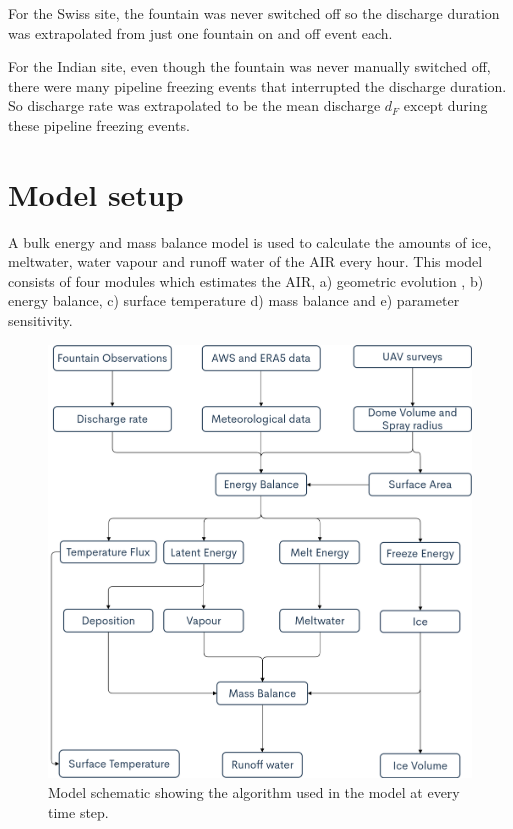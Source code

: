 \documentclass[utf8]{frontiersSCNS} %
\begin{document}
For the Swiss site, the fountain was never switched off so the discharge duration was extrapolated from just one fountain
on and off event each.

For the Indian site, even though the fountain was never manually switched off, there were many pipeline freezing events that
interrupted the discharge duration. So discharge rate was extrapolated to be the mean discharge $d_F$ except during
these pipeline freezing events.

\section{Model setup}

A bulk energy and mass balance model is used to calculate the amounts of ice, meltwater, water vapour and runoff water
of the AIR every hour. This model consists of four modules which estimates the AIR, a) geometric evolution , b) energy
balance, c) surface temperature d) mass balance and e) parameter sensitivity.

\begin{figure} \begin{center} \includegraphics[width=12 cm]{Figures/model_schematic.png} \end{center} \caption{Model
		schematic showing the algorithm used in the model at every time step. } \label{fig:schema} \end{figure}
\end{document}
